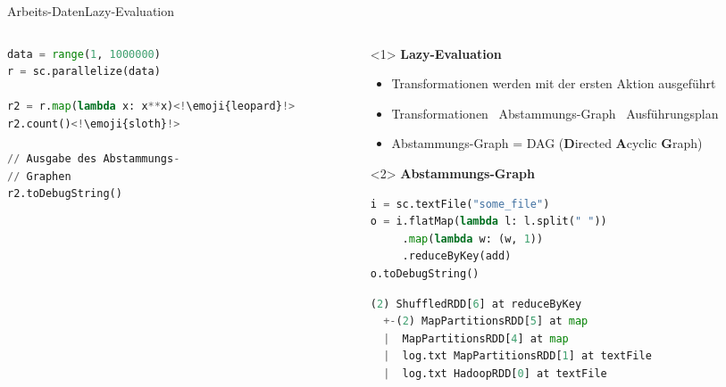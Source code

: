 \begin{frame}[fragile]{Arbeits-Daten}{Lazy-Evaluation}
	\begin{columns}
	\begin{column}{0.45\textwidth}
		\begin{lstlisting}[language=python]
data = range(1, 1000000)
r = sc.parallelize(data)

r2 = r.map(lambda x: x**x)<!\emoji{leopard}!>
r2.count()<!\emoji{sloth}!>

// Ausgabe des Abstammungs-
// Graphen
r2.toDebugString()
		\end{lstlisting}
	\end{column}
	\begin{column}{0.45\textwidth}
		\begin{onlyenv}<1>
			\textbf{Lazy-Evaluation}
			\begin{itemize}
				\item Transformationen werden mit der ersten Aktion ausgeführt
				\item Transformationen \rightarrow~Abstammungs-Graph \rightarrow~Ausführungsplan
				\item Abstammungs-Graph = DAG (\textbf{D}irected \textbf{A}cyclic \textbf{G}raph)
			\end{itemize}
		\end{onlyenv}
		\begin{onlyenv}<2>
			\textbf{Abstammungs-Graph}
			\begin{addmargin}[.6em]{0em}
			\begin{lstlisting}[language=python, basicstyle=\ttfamily\tiny]
i = sc.textFile("some_file")
o = i.flatMap(lambda l: l.split(" "))
     .map(lambda w: (w, 1))
     .reduceByKey(add)
o.toDebugString()
			\end{lstlisting}
			\begin{lstlisting}[language=python, basicstyle=\ttfamily\tiny]
(2) ShuffledRDD[6] at reduceByKey
  +-(2) MapPartitionsRDD[5] at map
  |  MapPartitionsRDD[4] at map
  |  log.txt MapPartitionsRDD[1] at textFile
  |  log.txt HadoopRDD[0] at textFile
			\end{lstlisting}
			\end{addmargin}
		\end{onlyenv}
	\end{column}
\end{columns}
\end{frame}

